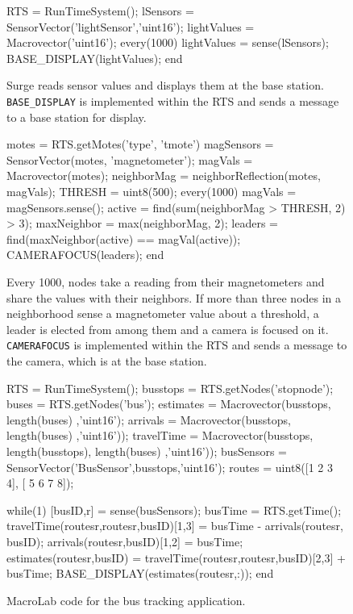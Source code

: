 \begin{figure}
  \begin{macrolab}
RTS = RunTimeSystem();
lSensors = SensorVector('lightSensor','uint16');
lightValues = Macrovector('uint16');
every(1000)
  lightValues =  sense(lSensors);
  BASE_DISPLAY(lightValues);
end
  \end{macrolab}
  \caption[A data collection application (Surge) in MacroLab]{Surge reads sensor
  values and displays them at the base station.  {\tt BASE\_DISPLAY} is
  implemented within the RTS and sends a message to a base station for display.}
  \label{code:Surge}
\end{figure}

\begin{figure}  
  \begin{macrolab}
motes = RTS.getMotes('type', 'tmote')
magSensors = SensorVector(motes, 'magnetometer');
magVals = Macrovector(motes);
neighborMag = neighborReflection(motes, magVals);
THRESH = uint8(500);
every(1000)
  magVals =  magSensors.sense();
  active = find(sum(neighborMag > THRESH, 2) > 3);
  maxNeighbor = max(neighborMag, 2);
  leaders = find(maxNeighbor(active) == magVal(active));
  CAMERAFOCUS(leaders);
end
  \end{macrolab}
  \caption[A tracking application (PEG) in MacroLab]{Every 1000\ms, nodes take a
  reading from their magnetometers and share the values with their neighbors.
  If more than three nodes in a neighborhood sense a magnetometer value about a
  threshold, a leader is elected from among them and a camera is focused on
  it. {\tt CAMERAFOCUS} is implemented within the RTS and sends a message to the
  camera, which is at the base station.}
  \label{code:PEG}
\end{figure}

\begin{figure}[t]
  \begin{macrolab}
    RTS = RunTimeSystem();
    busstops = RTS.getNodes('stopnode'); 
    buses = RTS.getNodes('bus');
    estimates = Macrovector(busstops, length(buses) ,'uint16');
    arrivals = Macrovector(busstops, length(buses) ,'uint16'));
    travelTime = Macrovector(busstops, length(busstops), length(buses) ,'uint16'));
    busSensors = SensorVector('BusSensor',busstops,'uint16');
    routes = uint8({[1 2 3 4], [ 5 6 7 8]}); %

    while(1)
      [busID,r] =  sense(busSensors);
      busTime = RTS.getTime();
      travelTime(routes{r},routes{r},busID)[1,3] = busTime - arrivals(routes{r}, busID);
      arrivals(routes{r},busID)[1,2] = busTime;
      estimates(routes{r},busID) = travelTime(routes{r},routes{r},busID)[2,3] + busTime;
      BASE_DISPLAY(estimates(routes{r},:));
    end
  \end{macrolab}
  \caption[A bus tracking application in MacroLab]{MacroLab code for the bus
  tracking application.}
  \label{code:BusTracking}
\end{figure}

